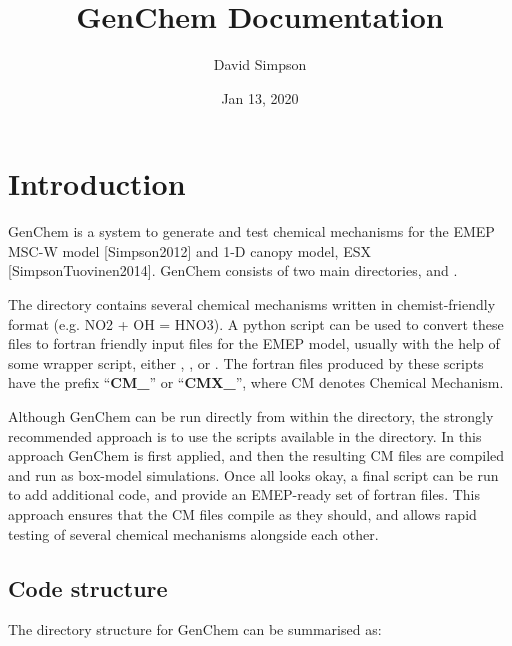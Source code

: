 \documentclass[a4paper,10pt,english]{sphinxmanual}
\title{GenChem Documentation}
\date{Jan 13, 2020}
\author{David Simpson}
\begin{document}
\pagestyle{empty}
\sphinxmaketitle
\pagestyle{plain}
\sphinxtableofcontents
\pagestyle{normal}
\label{\detokenize{index::doc}}



\chapter{Introduction}
\label{\detokenize{GenChemDoc_intro:introduction}}\label{\detokenize{GenChemDoc_intro::doc}}
GenChem is a system to generate and test chemical mechanisms for the
EMEP MSC-W model {[}Simpson2012{]} and 1-D canopy model, ESX {[}SimpsonTuovinen2014{]}.
GenChem consists of two main directories,  and .

The  directory contains several chemical mechanisms written
in chemist-friendly format (e.g.   NO2 + OH = HNO3).
A python script  can be used to convert these files
to fortran friendly input files for the EMEP model, usually with the help
of some wrapper script, either , , or .
The fortran files produced by these scripts
have the prefix “{\color{red}\bfseries{}CM\_}” or “{\color{red}\bfseries{}CMX\_}”, where CM denotes Chemical Mechanism.

Although GenChem can be run directly from within the  directory,
the strongly recommended  approach is to use the scripts available
in the  directory. In this approach GenChem is first applied, and
then the resulting CM files are compiled and run
as box-model simulations. Once all looks okay, a final script
can be run to add additional code, and provide an EMEP-ready
set of fortran files. This approach ensures that the CM files
compile as they should, and allows rapid testing of several chemical
mechanisms alongside each other.


\section{Code structure}
\label{\detokenize{GenChemDoc_intro:code-structure}}
The directory structure for GenChem can be summarised as:
\end{document}
